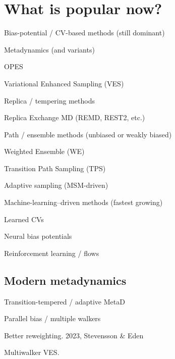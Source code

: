 \section{What is popular now?}
\begin{enumeratec}
    \item Bias-potential / CV-based methods (still dominant)
    \begin{itemizec}
        \item Metadynamics (and variants)
        \item OPES
        \item Variational Enhanced Sampling (VES)
    \end{itemizec}
    \item  Replica / tempering methods
    \begin{itemizec}
        \item Replica Exchange MD (REMD, REST2, etc.)
    \end{itemizec}
    \item Path / ensemble methods (unbiased or weakly biased)
    \begin{itemizec}
        \item Weighted Ensemble (WE)
        \item Transition Path Sampling (TPS)
        \item Adaptive sampling (MSM-driven)
    \end{itemizec}
    \item Machine-learning–driven methods (fastest growing)
    \begin{itemizec}
        \item Learned CVs
        \item Neural bias potentials
        \item Reinforcement learning / flows
    \end{itemizec}
\end{enumeratec}

\subsection{Modern metadynamics}
\begin{enumeratec}
    \item Transition-tempered / adaptive MetaD
    \item Parallel bias / multiple walkers
    \item Better reweighting.  2023, Stevensson \& Eden
    \item Multiwalker VES.
\end{enumeratec}
